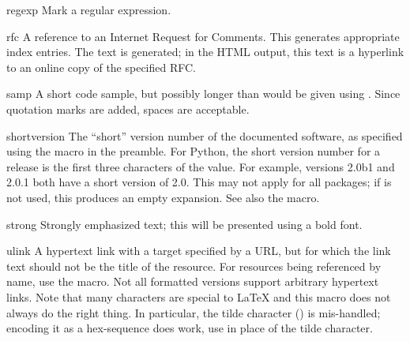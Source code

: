 \documentclass{howto}
\begin{document}
    \begin{macrodesc}{regexp}{}
      Mark a regular expression.
    \end{macrodesc}

    \begin{macrodesc}{rfc}{}
      A reference to an Internet Request for Comments.  This generates
      appropriate index entries.  The text  is
      generated; in the HTML output, this text is a hyperlink to an
      online copy of the specified RFC.
    \end{macrodesc}

    \begin{macrodesc}{samp}{}
      A short code sample, but possibly longer than would be given
      using .  Since quotation marks are added, spaces are
      acceptable.
    \end{macrodesc}

    \begin{macrodesc}{shortversion}{}
      The ``short'' version number of the documented software, as
      specified using the  macro in the
      preamble.  For Python, the short version number for a release is
      the first three characters of the  value.  For
      example, versions 2.0b1 and 2.0.1 both have a short version of
      2.0.  This may not apply for all packages; if
       is not used, this produces an empty
      expansion.  See also the  macro.
    \end{macrodesc}

    \begin{macrodesc}{strong}{}
      Strongly emphasized text; this will be presented using a bold
      font.
    \end{macrodesc}

    \begin{macrodesc}{ulink}{}
      A hypertext link with a target specified by a URL, but for which
      the link text should not be the title of the resource.  For
      resources being referenced by name, use the 
      macro.  Not all formatted versions support arbitrary hypertext
      links.  Note that many characters are special to \LaTeX{} and
      this macro does not always do the right thing.  In particular,
      the tilde character (\character{\~}) is mis-handled; encoding it
      as a hex-sequence does work, use  in place of the
      tilde character.
    \end{macrodesc}
\end{document}
